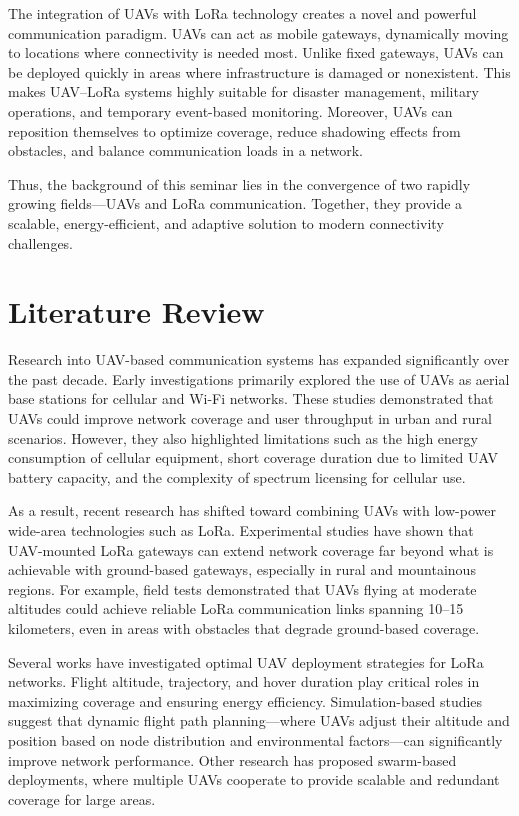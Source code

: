 The integration of UAVs with LoRa technology creates a novel and powerful communication paradigm. UAVs can act as mobile gateways, dynamically moving to locations where connectivity is needed most. Unlike fixed gateways, UAVs can be deployed quickly in areas where infrastructure is damaged or nonexistent. This makes UAV–LoRa systems highly suitable for disaster management, military operations, and temporary event-based monitoring. Moreover, UAVs can reposition themselves to optimize coverage, reduce shadowing effects from obstacles, and balance communication loads in a network.

Thus, the background of this seminar lies in the convergence of two rapidly growing fields—UAVs and LoRa communication. Together, they provide a scalable, energy-efficient, and adaptive solution to modern connectivity challenges.

\section*{Literature Review}

Research into UAV-based communication systems has expanded significantly over the past decade. Early investigations primarily explored the use of UAVs as aerial base stations for cellular and Wi-Fi networks. These studies demonstrated that UAVs could improve network coverage and user throughput in urban and rural scenarios. However, they also highlighted limitations such as the high energy consumption of cellular equipment, short coverage duration due to limited UAV battery capacity, and the complexity of spectrum licensing for cellular use.\cite{gallego2020enhancing}

As a result, recent research has shifted toward combining UAVs with low-power wide-area technologies such as LoRa. Experimental studies have shown that UAV-mounted LoRa gateways can extend network coverage far beyond what is achievable with ground-based gateways, especially in rural and mountainous regions. For example, field tests demonstrated that UAVs flying at moderate altitudes could achieve reliable LoRa communication links spanning 10–15 kilometers, even in areas with obstacles that degrade ground-based coverage.

Several works have investigated optimal UAV deployment strategies for LoRa networks. Flight altitude, trajectory, and hover duration play critical roles in maximizing coverage and ensuring energy efficiency. Simulation-based studies suggest that dynamic flight path planning—where UAVs adjust their altitude and position based on node distribution and environmental factors—can significantly improve network performance. Other research has proposed swarm-based deployments, where multiple UAVs cooperate to provide scalable and redundant coverage for large areas.\cite{ghazali2021systematic}


